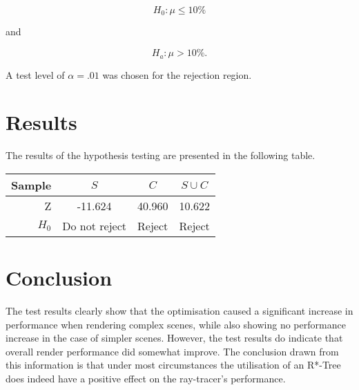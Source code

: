 \documentclass[a4paper]{article}
\begin{document}
$$ H_0: \mu \leq 10\% $$
\begin{center}
  and
\end{center}
$$ H_a: \mu > 10\%. $$

A test level of $\alpha = .01$ was chosen for the rejection region.

\section{Results}

The results of the hypothesis testing are presented in the following table.

\begin{center}
  \begin{tabular}{ | r || c | c | c | }
    \hline
    Sample  & $S$           & $C$    & $S \cup C$ \\ \hline \hline
    Z       & -11.624       & 40.960 & 10.622     \\ \hline
    $H_0$   & Do not reject & Reject & Reject     \\
    \hline
  \end{tabular}
\end{center}

\section{Conclusion}

The test results clearly show that the optimisation caused a significant increase in performance when rendering complex scenes, while also showing no performance increase in the case of simpler scenes. However, the test results do indicate that overall render performance did somewhat improve. The conclusion drawn from this information is that under most circumstances the utilisation of an R*-Tree does indeed have a positive effect on the ray-tracer's performance.
\end{document}
